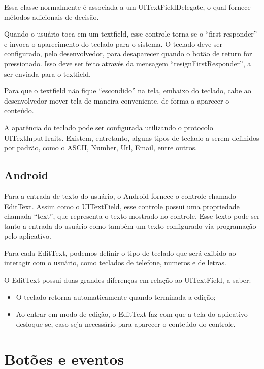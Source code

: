 	Essa classe normalmente é associada a um UITextFieldDelegate, o qual fornece métodos adicionais de decisão.
    
	Quando o usuário toca em um textfield, esse controle torna-se o ``first responder'' e invoca o aparecimento do teclado para o sistema. O teclado deve ser configurado, pelo desenvolvedor, para desaparecer quando o botão de return for pressionado. Isso deve ser feito através da mensagem ``resignFirstResponder'', a ser enviada para o textfield.
    
	Para que o textfield não fique ``escondido'' na tela, embaixo do teclado, cabe ao desenvolvedor mover tela de maneira conveniente, de forma a aparecer o conteúdo.
   
    A aparência do teclado pode ser configurada utilizando o protocolo UITextInputTraits. Existem, entretanto, alguns tipos de teclado a serem definidos por padrão, como o ASCII, Number, Url, Email, entre outros.
     
    \subsection{Android}
     
    Para a entrada de texto do usuário, o Android fornece o controle chamado EditText. Assim como o UITextField, esse controle possui uma propriedade chamada ``text'', que representa o texto mostrado no controle. Esse texto pode ser tanto a entrada do usuário como também um texto configurado via programação pelo aplicativo.
    
    
    
	Para cada EditText, podemos definir o tipo de teclado que será exibido ao interagir com o usuário, como teclados de telefone, numeros e de letras.
    
	O EditText possui duas grandes diferenças em relação ao UITextField, a saber:
\begin{itemize}
	\item O teclado retorna automaticamente quando terminada a edição;
	\item Ao entrar em modo de edição, o EditText faz com que a tela do aplicativo desloque-se, caso seja necessário para aparecer o conteúdo do controle.
\end{itemize}     
     
    \section {Botões e eventos}
     
